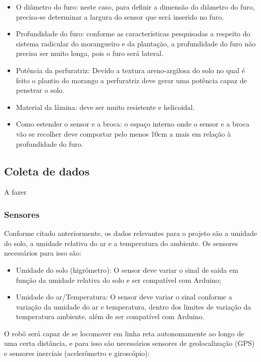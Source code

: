 \begin{itemize}
	\item O diâmetro do furo: neste caso, para definir a dimensão do diâmetro do furo, precisa-se determinar a largura do sensor que será inserido no furo. 
	\item Profundidade do furo: conforme as características  pesquisadas a respeito do sistema radicular do morangueiro e da plantação, a profundidade do furo não precisa ser muito longa, pois o furo será lateral.
	\item Potência da perfuratriz: Devido a textura areno-argilosa do solo no qual é feito o plantio do morango a perfuratriz deve gerar uma potência capaz de penetrar o solo. 
	\item Material da lâmina: deve ser muito resistente e helicoidal.
	\item Como estender o sensor e a broca: o espaço interno onde o sensor e a broca vão se recolher deve comportar pelo menos 10cm a mais em relação à profundidade do furo.
\end{itemize}

\subsection{Coleta de dados}

A fazer

\subsubsection{Sensores}

Conforme citado anteriormente, os dados relevantes para o projeto são a umidade do solo, a umidade relativa do ar e a temperatura do ambiente. Os sensores necessários para isso são:

\begin{itemize}
	\item Umidade do solo (higrômetro): O sensor deve variar o sinal de saída em função da umidade relativa do solo e ser compatível com Arduino;
	\item Umidade do ar/Temperatura:  O sensor deve variar o sinal conforme a variação da umidade do ar e temperatura, dentro dos limites de variação da temperatura ambiente, além de ser compatível com Arduino.
\end{itemize}

O robô será capaz de se locomover em linha reta autonomamente ao longo de uma certa distância, e para isso são necessários sensores de geolocalização (GPS) e sensores inerciais (acelerômetro e giroscópio):

